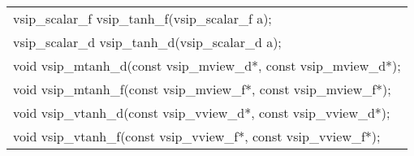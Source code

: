 \\\cvsiplh
\afh
\\\hspace*{.04\textwidth} {
\ttfamily
\begin{tabular}[H]{l}
vsip\_scalar\_f vsip\_tanh\_f(vsip\_scalar\_f a);\\
vsip\_scalar\_d vsip\_tanh\_d(vsip\_scalar\_d a);\\
void vsip\_mtanh\_d(const vsip\_mview\_d*, const vsip\_mview\_d*);\\
void vsip\_mtanh\_f(const vsip\_mview\_f*, const vsip\_mview\_f*);\\
void vsip\_vtanh\_d(const vsip\_vview\_d*, const vsip\_vview\_d*);\\
void vsip\_vtanh\_f(const vsip\_vview\_f*, const vsip\_vview\_f*);\\
\end{tabular}
}
\\\pyjvsiph
{}
